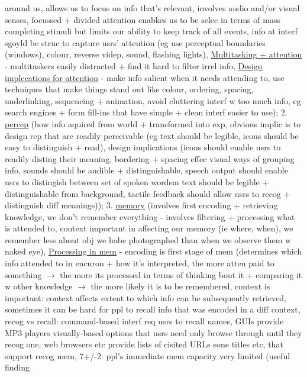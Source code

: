 \documentclass[a4paper]{article}
\begin{document}
\begin{multicols}{3}
        around us, allows us to focus on info that's relevant, involves audio and/or visual senses, focussed + divided attention enabkes us to be selec in terms of mass completing stimuli but limits our ability to keep
        track of all events, info at interf sgoyld be struc to capture usrs' attention (eg use perceptual boundaries (windows), colour, reverse videp, sound, flashing lights), \underline{Multitasking + attention} -
        multitaskers easily distracted + find it hard to filter irrel info, \underline{Design implecations for attention} - make info salient when it needs attending to, use techniques that make things stand out like colour,
        ordering, spacing, underlinking, sequencing + animation, avoid cluttering interf w too much info, eg search engines + form fill-ins that have simple + clean interf easier to use); 2. \underline{percep} (how info
        aquired from world + transformed into exp, obvious implic is to design rep that are readily perceivable (eg text should be legible, icons should be easy to distinguish + read), design implications (icons should
        enable usrs to readily disting their meaning, bordering + spacing effec visual ways of grouping info, sounds should be audible + distinguishable, speech output should enable usrs to distingish between set of spoken wordsm
        text should be legible + distinguishable from background, tactile feedback should allow usrs to recog + distinguish diff meanings)); 3. \underline{memory} (involves first encoding + retrieving knowledge, we don't
        remember everything - involves filtering + processing what is attended to, context important in affecting our memory (ie where, when), we remember less about obj we habe photographed than when we observe them w
        naked eye), \underline{Processing in mem} - encoding is first stage of mem (determines which info attended to in encuron + how it's interpreted, the more atten paid to something $\to$ the more its processed
        in terms of thinking bout it + comparing it w other knowledge $\to$ the more likely it is to be remembered, context is important: context affects extent to which info can be subsequently retrieved, sometimes it
        can be hard for ppl to recall info that was encoded in a diff context, recog vs recall: command-based interf req usrs to recall names, GUIs provide MP3 players visually-based options
        that usrs need only browse through until they recog one, web browsers etc provide lists of cisited URLs sone titles etc, that support recog mem, 7+/-2: ppl's immediate mem capacity very limited (useful finding

\end{multicols}
\end{document}
